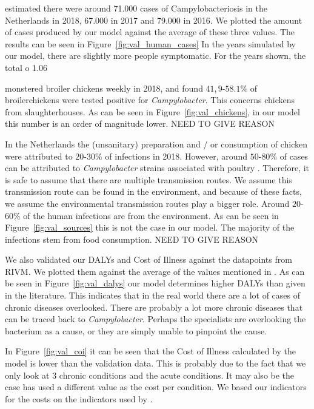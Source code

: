 \textcite{vlaanderen_staat_2019} estimated there were around 71.000 cases of Campylobacteriosis in the Netherlands in 2018, 67.000 in 2017 and 79.000 in 2016. We plotted the amount of cases produced by our model against the average of these three values. The results can be seen in Figure~\ref{fig:val_human_cases} In the years simulated by our model, there are slightly more people symptomatic. For the years shown, the total o 1.06

\textcite{nepluvi_rapportage_2019} monstered broiler chickens weekly in 2018, and found $41,9$-$58.1\%$ of broilerchickens were tested positive for \textit{Campylobacter}. This concerns chickens from slaughterhouses. As can be seen in Figure~\ref{fig:val_chickens}, in our model this number is an order of magnitude lower. NEED TO GIVE REASON

In the Netherlands the (unsanitary) preparation and / or consumption of chicken were attributed to $20$-$30\%$ of infections in 2018. However, around $50$-$80\%$ of cases can be attributed to \textit{Campylobacter} strains associated with poultry \parencite{cuperus_surveillance_2020, nepluvi_rapportage_2019}. Therefore, it is safe to assume that there are multiple transmission routes. We assume this transmission route can be found in the environment, and because of these facts, we assume the environmental transmission routes play a bigger role. Around $20$-$60\%$ of the human infections are from the environment. As can be seen in Figure~\ref{fig:val_sources} this is not the case in our model. The majority of the infections stem from food consumption. NEED TO GIVE REASON

We also validated our DALYs and Cost of Illness against the datapoints from RIVM. We plotted them against the average of the values mentioned in . As can be seen in Figure~\ref{fig:val_dalys} our model determines higher DALYs than given in the literature. This indicates that in the real world there are a lot of cases of chronic diseases overlooked. There are probably a lot more chronic diseases that can be traced back to \textit{Campylobacter}. Perhaps the specialists are overlooking the bacterium as a cause, or they are simply unable to pinpoint the cause.

In Figure~\ref{fig:val_coi} it can be seen that the Cost of Illness calculated by the model is lower than the validation data. This is probably due to the fact that we only look at 3 chronic conditions and the acute conditions. It may also be the case \citeauthor{vlaanderen_staat_2019} has used a different value as the cost per condition. We based our indicators for the costs on the indicators used by \textcite{mangen_campylobacteriosis_2007}.

